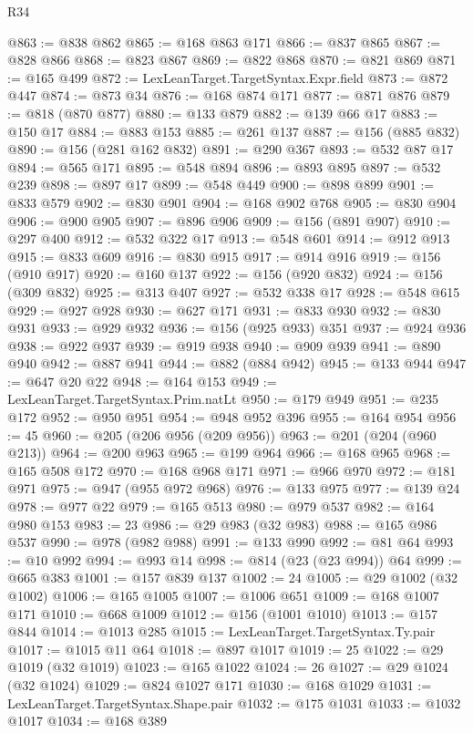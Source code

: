 \begin{lexlean}{R34}
\begin{coremodule}
@863 := @838 @862
@865 := @168 @863 @171
@866 := @837 @865
@867 := @828 @866
@868 := @823 @867
@869 := @822 @868
@870 := @821 @869
@871 := @165 @499
@872 := LexLeanTarget.TargetSyntax.Expr.field
@873 := @872 @447
@874 := @873 @34
@876 := @168 @874 @171
@877 := @871 @876
@879 := @818 (@870 @877)
@880 := @133 @879
@882 := @139 @66 @17
@883 := @150 @17
@884 := @883 @153
@885 := @261 @137
@887 := @156 (@885 @832)
@890 := @156 (@281 @162 @832)
@891 := @290 @367
@893 := @532 @87 @17
@894 := @565 @171
@895 := @548 @894
@896 := @893 @895
@897 := @532 @239
@898 := @897 @17
@899 := @548 @449
@900 := @898 @899
@901 := @833 @579
@902 := @830 @901
@904 := @168 @902 @768
@905 := @830 @904
@906 := @900 @905
@907 := @896 @906
@909 := @156 (@891 @907)
@910 := @297 @400
@912 := @532 @322 @17
@913 := @548 @601
@914 := @912 @913
@915 := @833 @609
@916 := @830 @915
@917 := @914 @916
@919 := @156 (@910 @917)
@920 := @160 @137
@922 := @156 (@920 @832)
@924 := @156 (@309 @832)
@925 := @313 @407
@927 := @532 @338 @17
@928 := @548 @615
@929 := @927 @928
@930 := @627 @171
@931 := @833 @930
@932 := @830 @931
@933 := @929 @932
@936 := @156 (@925 @933) @351
@937 := @924 @936
@938 := @922 @937
@939 := @919 @938
@940 := @909 @939
@941 := @890 @940
@942 := @887 @941
@944 := @882 (@884 @942)
@945 := @133 @944
@947 := @647 @20 @22
@948 := @164 @153
@949 := LexLeanTarget.TargetSyntax.Prim.natLt
@950 := @179 @949
@951 := @235 @172
@952 := @950 @951
@954 := @948 @952 @396
@955 := @164 @954
@956 := 45
@960 := @205 (@206 @956 (@209 @956))
@963 := @201 (@204 (@960 @213))
@964 := @200 @963
@965 := @199 @964
@966 := @168 @965
@968 := @165 @508 @172
@970 := @168 @968 @171
@971 := @966 @970
@972 := @181 @971
@975 := @947 (@955 @972 @968)
@976 := @133 @975
@977 := @139 @24
@978 := @977 @22
@979 := @165 @513
@980 := @979 @537
@982 := @164 @980 @153
@983 := 23
@986 := @29 @983 (@32 @983)
@988 := @165 @986 @537
@990 := @978 (@982 @988)
@991 := @133 @990
@992 := @81 @64
@993 := @10 @992
@994 := @993 @14
@998 := @814 (@23 (@23 @994)) @64
@999 := @665 @383
@1001 := @157 @839 @137
@1002 := 24
@1005 := @29 @1002 (@32 @1002)
@1006 := @165 @1005
@1007 := @1006 @651
@1009 := @168 @1007 @171
@1010 := @668 @1009
@1012 := @156 (@1001 @1010)
@1013 := @157 @844
@1014 := @1013 @285
@1015 := LexLeanTarget.TargetSyntax.Ty.pair
@1017 := @1015 @11 @64
@1018 := @897 @1017
@1019 := 25
@1022 := @29 @1019 (@32 @1019)
@1023 := @165 @1022
@1024 := 26
@1027 := @29 @1024 (@32 @1024)
@1029 := @824 @1027 @171
@1030 := @168 @1029
@1031 := LexLeanTarget.TargetSyntax.Shape.pair
@1032 := @175 @1031
@1033 := @1032 @1017
@1034 := @168 @389

\end{coremodule}
\end{lexlean}
